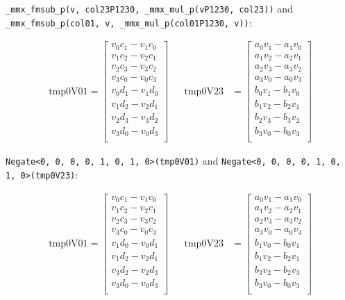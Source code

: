\documentclass[fontsize = 10pt,DIV = 13]{scrartcl}
\begin{document}
\texttt{_mmx_fmsub_p(v, col23P1230, _mmx_mul_p(vP1230, col23))} and \newline \texttt{_mmx_fmsub_p(col01, v, _mmx_mul_p(col01P1230, v))}:

\begin{align*}
\mathrm{tmp0V01} 
=
\begin{bmatrix}
v_0c_1 - v_1c_0\\
v_1c_2 - v_2c_1\\
v_2c_3 - v_3c_2\\
v_3c_0 - v_0c_3\\
v_0d_1 - v_1d_0\\
v_1d_2 - v_2d_1\\
v_2d_3 - v_3d_2\\
v_3d_0 - v_0d_3\\
\end{bmatrix}
&&
\mathrm{tmp0V23} 
&=
\begin{bmatrix}
a_0v_1 - a_1v_0\\
a_1v_2 - a_2v_1\\
a_2v_3 - a_3v_2\\
a_3v_0 - a_0v_3\\
b_0v_1 - b_1v_0\\
b_1v_2 - b_2v_1\\
b_2v_3 - b_3v_2\\
b_3v_0 - b_0v_3\\
\end{bmatrix}
\end{align*}

\texttt{Negate<0, 0, 0, 0, 1, 0, 1, 0>(tmp0V01)} and \newline \texttt{Negate<0, 0, 0, 0, 1, 0, 1, 0>(tmp0V23)}: 

\begin{align*}
\mathrm{tmp0V01} 
=
\begin{bmatrix}
v_0c_1 - v_1c_0\\
v_1c_2 - v_2c_1\\
v_2c_3 - v_3c_2\\
v_3c_0 - v_0c_3\\
v_1d_0 - v_0d_1\\
v_1d_2 - v_2d_1\\
v_3d_2 - v_2d_3\\
v_3d_0 - v_0d_3\\
\end{bmatrix}
&&
\mathrm{tmp0V23} 
&=
\begin{bmatrix}
a_0v_1 - a_1v_0\\
a_1v_2 - a_2v_1\\
a_2v_3 - a_3v_2\\
a_3v_0 - a_0v_3\\
b_1v_0 - b_0v_1\\
b_1v_2 - b_2v_1\\
b_3v_2 - b_2v_3\\
b_3v_0 - b_0v_3\\
\end{bmatrix}
\end{align*}
\end{document}
